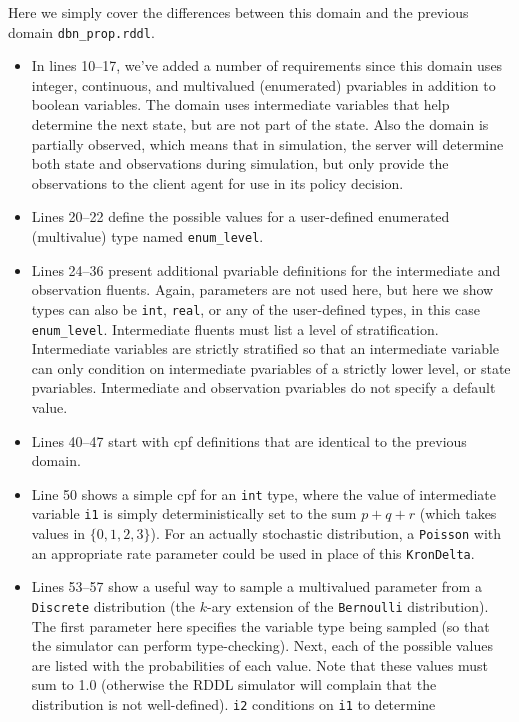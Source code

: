 \documentclass[11pt,a4paper]{article}
\begin{document}
Here we simply cover the differences between this domain and the
previous domain \texttt{dbn\_prop.rddl}.
\begin{itemize}  
\item In lines 10--17, we've added a number of requirements since
this domain uses integer, continuous, and multivalued (enumerated)
pvariables in addition to boolean variables.  The domain uses
intermediate variables that help determine the next state, but are
not part of the state.  
Also the domain is partially observed,
which means that in simulation, the server will determine both
state and observations during simulation, but only provide the
observations to the client agent for use in its policy decision.
\item Lines 20--22 define the possible values for a user-defined
enumerated (multivalue) type named \texttt{enum\_level}.
\item Lines 24--36 present additional pvariable definitions for
the intermediate and observation fluents.  Again, parameters are not used
here, but here we show types can also be \texttt{int}, \texttt{real},
or any of the user-defined types, in this case \texttt{enum\_level}.
Intermediate fluents must list a level of stratification. 
Intermediate variables are 
strictly stratified so that an intermediate variable can only
condition on intermediate pvariables of a strictly lower level,
or state pvariables.  Intermediate and observation pvariables do not
specify a default value.
\item Lines 40--47 start with cpf definitions that are identical 
to the previous domain.
\item Line 50 shows a simple cpf for an \texttt{int} type, where the
value of intermediate variable \texttt{i1} is simply deterministically
set to the sum $p + q + r$ (which takes values in $\{0,1,2,3\}$).  For
an actually stochastic distribution, a \texttt{Poisson} with an
appropriate rate parameter could be used in place of this
\texttt{KronDelta}.
\item Lines 53--57 show a useful way to sample a multivalued parameter
from a \texttt{Discrete} distribution (the $k$-ary extension of the
\texttt{Bernoulli} distribution).  The first parameter here specifies
the variable type being sampled (so that the simulator can perform
type-checking).  Next, each of the possible values are listed with the
probabilities of each value.  Note that these values must sum to 1.0
(otherwise the RDDL simulator will complain that the distribution is
not well-defined).  \texttt{i2} conditions on \texttt{i1} to determine

\end{itemize}
\end{document}
